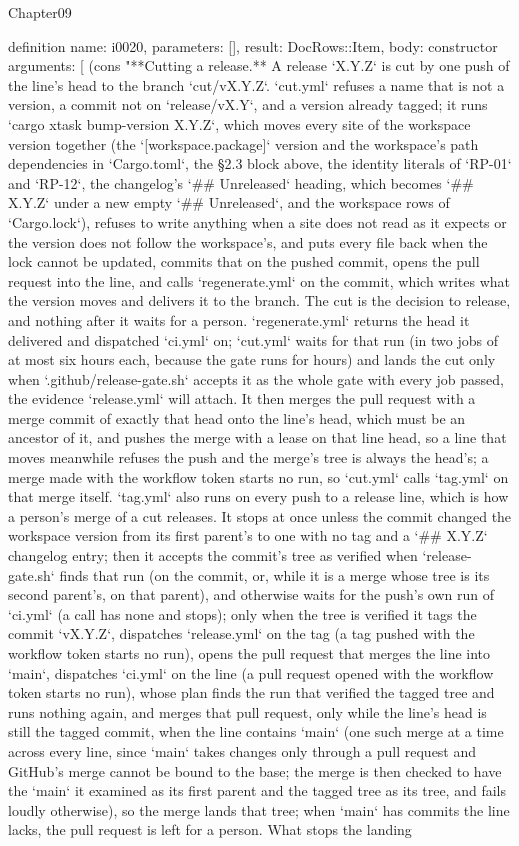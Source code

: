 \begin{lexlean}{Chapter09}
\begin{semanticmodule}
definition{
  name: i0020,
  parameters: [],
  result: DocRows::Item,
  body: constructor{
    arguments: [
      (cons "**Cutting a release.** A release `X.Y.Z` is cut by one push of the line's head to the branch `cut/vX.Y.Z`. `cut.yml` refuses a name that is not a version, a commit not on `release/vX.Y`, and a version already tagged; it runs `cargo xtask bump-version X.Y.Z`, which moves every site of the workspace version together (the `[workspace.package]` version and the workspace's path dependencies in `Cargo.toml`, the §2.3 block above, the identity literals of `RP-01` and `RP-12`, the changelog's `## Unreleased` heading, which becomes `## X.Y.Z` under a new empty `## Unreleased`, and the workspace rows of `Cargo.lock`), refuses to write anything when a site does not read as it expects or the version does not follow the workspace's, and puts every file back when the lock cannot be updated, commits that on the pushed commit, opens the pull request into the line, and calls `regenerate.yml` on the commit, which writes what the version moves and delivers it to the branch. The cut is the decision to release, and nothing after it waits for a person. `regenerate.yml` returns the head it delivered and dispatched `ci.yml` on; `cut.yml` waits for that run (in two jobs of at most six hours each, because the gate runs for hours) and lands the cut only when `.github/release-gate.sh` accepts it as the whole gate with every job passed, the evidence `release.yml` will attach. It then merges the pull request with a merge commit of exactly that head onto the line's head, which must be an ancestor of it, and pushes the merge with a lease on that line head, so a line that moves meanwhile refuses the push and the merge's tree is always the head's; a merge made with the workflow token starts no run, so `cut.yml` calls `tag.yml` on that merge itself. `tag.yml` also runs on every push to a release line, which is how a person's merge of a cut releases. It stops at once unless the commit changed the workspace version from its first parent's to one with no tag and a `## X.Y.Z` changelog entry; then it accepts the commit's tree as verified when `release-gate.sh` finds that run (on the commit, or, while it is a merge whose tree is its second parent's, on that parent), and otherwise waits for the push's own run of `ci.yml` (a call has none and stops); only when the tree is verified it tags the commit `vX.Y.Z`, dispatches `release.yml` on the tag (a tag pushed with the workflow token starts no run), opens the pull request that merges the line into `main`, dispatches `ci.yml` on the line (a pull request opened with the workflow token starts no run), whose plan finds the run that verified the tagged tree and runs nothing again, and merges that pull request, only while the line's head is still the tagged commit, when the line contains `main` (one such merge at a time across every line, since `main` takes changes only through a pull request and GitHub's merge cannot be bound to the base; the merge is then checked to have the `main` it examined as its first parent and the tagged tree as its tree, and fails loudly otherwise), so the merge lands that tree; when `main` has commits the line lacks, the pull request is left for a person. What stops the landing }}
\end{semanticmodule}
\end{lexlean}
